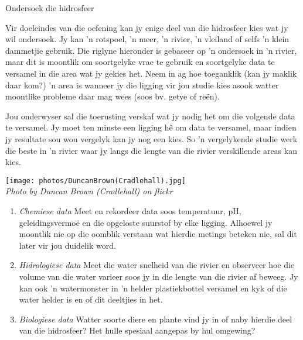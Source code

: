             \begin{Investigation}{Ondersoek die hidrosfeer }
            \nopagebreak 
\begin{minipage}{.5\textwidth}
            \label{m38138*uid4}
Vir doeleindes van die oefening kan jy enige deel van die hidrosfeer kies wat jy wil ondersoek. Jy kan  'n rotspoel,  'n meer,  'n rivier,  'n vleiland of selfs  'n klein dammetjie gebruik. Die riglyne hieronder is gebaseer op  'n ondersoek in  'n rivier, maar dit is moontlik om soortgelyke vrae te gebruik en soortgelyke data te versamel in die area wat jy gekies het. Neem in ag hoe toeganklik (kan jy maklik daar kom?)  'n area is wanneer jy die ligging vir jou studie kies asook watter moontlike probleme daar mag wees (soos bv. getye of re\"{e}n).\par
\label{m38138*uid5}
Jou onderwyser sal die toerusting verskaf wat jy nodig het om die volgende data te versamel. Jy moet ten minste een ligging h\^{e} om data te versamel, maar indien jy resultate sou wou vergelyk kan jy nog een kies. So  'n vergelykende studie werk die beste in  'n rivier waar jy langs die lengte van die rivier verskillende areas kan kies. \par
\end{minipage}
\begin{minipage}{.5\textwidth}
\begin{center}
 \texttt{[image: photos/DuncanBrown(Cradlehall).jpg]} \\
\textsl{Photo by Duncan Brown (Cradlehall) on flickr}
\end{center}
\end{minipage}
\label{m38138*id334646}\begin{enumerate}[noitemsep, label=\textbf{\arabic*}. ] 
            \label{m38138*uid6}\item \textsl{Chemiese data}
Meet en rekordeer data soos temperatuur, pH, geleidingsvermoë en die opgeloste suurstof by elke ligging. Alhoewel jy moontlik nie op die oomblik verstaan wat hierdie metings beteken nie, sal dit later vir jou duidelik word.
\label{m38138*uid7}\item \textsl{Hidrologiese data}
Meet die water snelheid van die rivier en observeer hoe die volume van die water varieer soos jy in die lengte van die rivier af beweeg. Jy kan ook  'n watermonster in  'n helder plastiekbottel versamel en kyk of die water helder is en of dit deeltjies in het.
\label{m38138*uid8}\item \textsl{Biologiese data}
Watter soorte diere en plante vind jy in of naby hierdie deel van die hidrosfeer? Het hulle spesiaal aangepas by hul omgewing?
\end{enumerate}


\end{Investigation}
